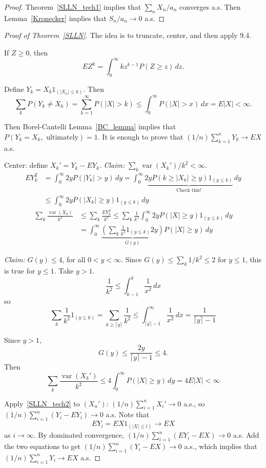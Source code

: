 \begin{proof}
Theorem~\ref{SLLN_tech1} implies that $\sum_n X_n / a_n$ converges a.s. Then Lemma~\ref{Kronecker} implies that $S_n / a_n \to 0$ a.s.
\end{proof}

\begin{proof}[Proof of Theorem~\ref{SLLN}]
The idea is to truncate, center, and then apply 9.4.

If $Z \geq 0$, then
\[
EZ^k = \int_0^{\infty} kz^{k-1} P(Z \geq z) \, dz.
\]

Define $Y_k = X_k 1_{(|X_k| \leq k)}$. Then
\[
\sum_k P(Y_k \neq X_k) = \sum_{k=1}^{\infty} P(|X| > k) \leq \int_0^{\infty} P(|X| > x) \, dx = E|X| < \infty.
\]

Then Borel-Cantelli Lemma~\ref{BC_lemma} implies that $P(Y_k = X_k, \text{ ultimately}) = 1$. It is enough to prove that $(1/n) \sum_{k=1}^{n} Y_k \to EX$ a.s.

Center: define $X_k' = Y_k - EY_k$. \textit{Claim:} $\sum_k \operatorname{var}(X_k')/k^2 < \infty$.
\begin{align*}
EY_k^2 &= \int_0^{\infty} 2y P(|Y_k| > y) \, dy = \int_0^{\infty} \underbrace{2y P(k \geq |X_k| \geq y) 1_{(y \leq k)}}_{\text{Check this!}} \, dy \\
&\leq \int_0^{\infty} 2y P(|X_k| \geq y) 1_{(y \leq k)} \, dy
\end{align*}
\begin{align*}
\sum_k \frac{\operatorname{var}(X_k)}{k^2} &\leq \sum_k \frac{EY_k^2}{k^2} \leq \sum_k \frac{1}{k^2} \int_0^{\infty} 2y P(|X| \geq y) 1_{(y \leq k)} \, dy \\
&= \int_0^{\infty} \underbrace{\left(\sum_k \frac{1}{k^2} 1_{(y \leq k)} 2y\right)}_{G(y)} P(|X| \geq y) \, dy
\end{align*}

\textit{Claim:} $G(y) \leq 4$, for all $0 < y < \infty$. Since $G(y) \leq \sum_k 1/k^2 \leq 2$ for $y \leq 1$, this is true for $y \leq 1$. Take $y > 1$.
\[
\frac{1}{k^2} \leq \int_{k-1}^{k} \frac{1}{x^2} \, dx
\]
so
\[
\sum_k \frac{1}{k^2} 1_{(y \leq k)} = \sum_{k \geq \lceil y \rceil} \frac{1}{k^2} \leq \int_{\lceil y \rceil - 1}^{\infty} \frac{1}{x^2} \, dx = \frac{1}{\lceil y \rceil - 1}
\]

Since $y > 1$,
\[
G(y) \leq \frac{2y}{\lceil y \rceil - 1} \leq 4.
\]
Then
\[
\sum_k \frac{\operatorname{var}(X_k')}{k^2} \leq 4 \int_0^{\infty} P(|X| \geq y) \, dy = 4E|X| < \infty
\]

Apply~\ref{SLLN_tech2} to $(X_n')$: $(1/n) \sum_{i=1}^{n} X_i' \to 0$ a.s., so $(1/n) \sum_{i=1}^{n} (Y_i - EY_i) \to 0$ a.s. Note that
\[
EY_i = EX 1_{(|X| \leq i)} \to EX
\]
as $i \to \infty$. By dominated convergence, $(1/n) \sum_{i=1}^{n} (EY_i - EX) \to 0$ a.s. Add the two equations to get $(1/n) \sum_{i=1}^{n} (Y_i - EX) \to 0$ a.s., which implies that $(1/n) \sum_{i=1}^{n} Y_i \to EX$ a.s.
\end{proof}

